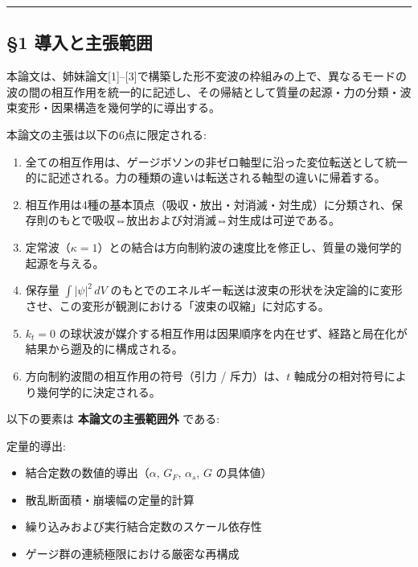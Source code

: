 \documentclass[
  a4paper,11pt]{ltjsarticle}
\providecommand{\tightlist}{%
  \setlength{\itemsep}{0pt}\setlength{\parskip}{0pt}}
\theoremstyle{definition}
\theoremstyle{remark}
\begin{document}
\begin{center}\rule{0.5\linewidth}{0.5pt}\end{center}

\subsection{§1
導入と主張範囲}\label{ux5c0eux5165ux3068ux4e3bux5f35ux7bc4ux56f2}

本論文は、姉妹論文{[}1{]}--{[}3{]}で構築した形不変波の枠組みの上で、異なるモードの波の間の相互作用を統一的に記述し、その帰結として質量の起源・力の分類・波束変形・因果構造を幾何学的に導出する。

本論文の主張は以下の6点に限定される:

\begin{enumerate}
\def\labelenumi{\arabic{enumi}.}
\tightlist
\item
  全ての相互作用は、ゲージボソンの非ゼロ軸型に沿った変位転送として統一的に記述される。力の種類の違いは転送される軸型の違いに帰着する。
\item
  相互作用は4種の基本頂点（吸収・放出・対消滅・対生成）に分類され、保存則のもとで吸収⇔放出および対消滅⇔対生成は可逆である。
\item
  定常波（\(\kappa = 1\)）との結合は方向制約波の速度比を修正し、質量の幾何学的起源を与える。
\item
  保存量 \(\int |\psi|^2 \, dV\)
  のもとでのエネルギー転送は波束の形状を決定論的に変形させ、この変形が観測における「波束の収縮」に対応する。
\item
  \(k_t = 0\)
  の球状波が媒介する相互作用は因果順序を内在せず、経路と局在化が結果から遡及的に構成される。
\item
  方向制約波間の相互作用の符号（引力 / 斥力）は、\(t\)
  軸成分の相対符号により幾何学的に決定される。
\end{enumerate}

以下の要素は \textbf{本論文の主張範囲外} である:

定量的導出:

\begin{itemize}
\tightlist
\item
  結合定数の数値的導出（\(\alpha\), \(G_F\), \(\alpha_s\), \(G\)
  の具体値）
\item
  散乱断面積・崩壊幅の定量的計算
\item
  繰り込みおよび実行結合定数のスケール依存性
\item
  ゲージ群の連続極限における厳密な再構成
\end{itemize}
\end{document}
